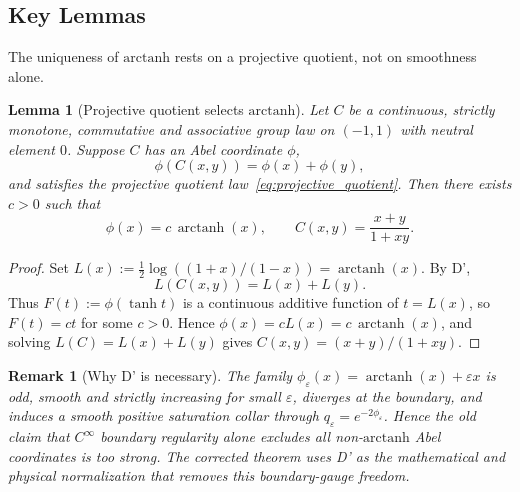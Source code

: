 \documentclass[aps,prd,twocolumn,superscriptaddress,nofootinbib]{revtex4-2}
\newtheorem{lemma}{Lemma}
\newtheorem{remark}{Remark}
\begin{document}
\subsection{Key Lemmas}

The uniqueness of $\mathrm{arctanh}$ rests on a projective quotient, not on smoothness alone.

\begin{lemma}[Projective quotient selects $\mathrm{arctanh}$]\label{lem:projective_arctanh}
Let $C$ be a continuous, strictly monotone, commutative and associative group law on $(-1,1)$ with neutral element $0$. Suppose $C$ has an Abel coordinate $\phi$,
\[
  \phi(C(x,y))=\phi(x)+\phi(y),
\]
and satisfies the projective quotient law~\eqref{eq:projective_quotient}. Then there exists $c>0$ such that
\[
  \phi(x)=c\,\operatorname{arctanh}(x),
  \qquad
  C(x,y)=\frac{x+y}{1+xy}.
\]
\end{lemma}

\begin{proof}
Set $L(x):=\frac12\log((1+x)/(1-x))=\operatorname{arctanh}(x)$. By D',
\[
  L(C(x,y))=L(x)+L(y).
\]
Thus $F(t):=\phi(\tanh t)$ is a continuous additive function of $t=L(x)$, so $F(t)=ct$ for some $c>0$. Hence $\phi(x)=cL(x)=c\,\operatorname{arctanh}(x)$, and solving $L(C)=L(x)+L(y)$ gives $C(x,y)=(x+y)/(1+xy)$.
\end{proof}

\begin{remark}[Why D' is necessary]
The family $\phi_\varepsilon(x)=\operatorname{arctanh}(x)+\varepsilon x$ is odd, smooth and strictly increasing for small $\varepsilon$, diverges at the boundary, and induces a smooth positive saturation collar through $q_\varepsilon=e^{-2\phi_\varepsilon}$. Hence the old claim that $C^\infty$ boundary regularity alone excludes all non-$\mathrm{arctanh}$ Abel coordinates is too strong. The corrected theorem uses D' as the mathematical and physical normalization that removes this boundary-gauge freedom.
\end{remark}
\end{document}
